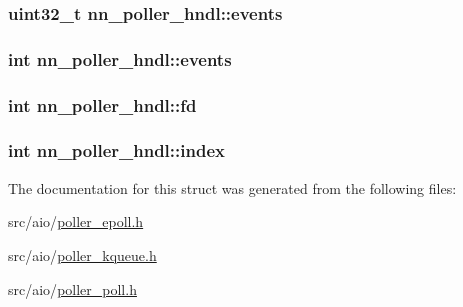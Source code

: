 \subsubsection[{events}]{\setlength{\rightskip}{0pt plus 5cm}uint32\+\_\+t nn\+\_\+poller\+\_\+hndl\+::events}\hypertarget{structnn__poller__hndl_a8e8b359d3ccfcfae5aa53f4c13a0e573}{}\label{structnn__poller__hndl_a8e8b359d3ccfcfae5aa53f4c13a0e573}
\subsubsection[{events}]{\setlength{\rightskip}{0pt plus 5cm}int nn\+\_\+poller\+\_\+hndl\+::events}\hypertarget{structnn__poller__hndl_ae1ebcb140ef6540a8bd528eea997985f}{}\label{structnn__poller__hndl_ae1ebcb140ef6540a8bd528eea997985f}
\subsubsection[{fd}]{\setlength{\rightskip}{0pt plus 5cm}int nn\+\_\+poller\+\_\+hndl\+::fd}\hypertarget{structnn__poller__hndl_a771d23018b76a0624c147c37b61c3494}{}\label{structnn__poller__hndl_a771d23018b76a0624c147c37b61c3494}
\subsubsection[{index}]{\setlength{\rightskip}{0pt plus 5cm}int nn\+\_\+poller\+\_\+hndl\+::index}\hypertarget{structnn__poller__hndl_ac6bda1e59ff90470cea88327c6d023d1}{}\label{structnn__poller__hndl_ac6bda1e59ff90470cea88327c6d023d1}


The documentation for this struct was generated from the following files\+:\begin{DoxyCompactItemize}
\item 
src/aio/\hyperlink{poller__epoll_8h}{poller\+\_\+epoll.\+h}\item 
src/aio/\hyperlink{poller__kqueue_8h}{poller\+\_\+kqueue.\+h}\item 
src/aio/\hyperlink{poller__poll_8h}{poller\+\_\+poll.\+h}\end{DoxyCompactItemize}
